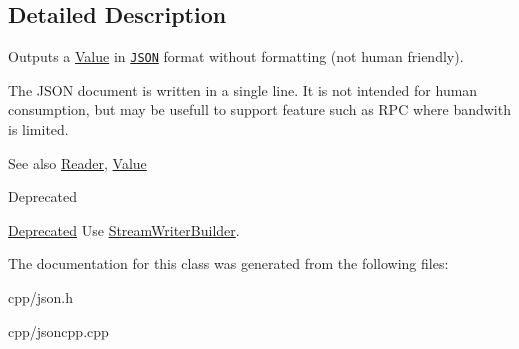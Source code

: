 \subsection{Detailed Description}
Outputs a \hyperlink{class_json_1_1_value}{Value} in \href{http://www.json.org}{\tt J\+S\+ON} format without formatting (not human friendly). 

The J\+S\+ON document is written in a single line. It is not intended for \textquotesingle{}human\textquotesingle{} consumption, but may be usefull to support feature such as R\+PC where bandwith is limited. \begin{DoxySeeAlso}{See also}
\hyperlink{class_json_1_1_reader}{Reader}, \hyperlink{class_json_1_1_value}{Value} 
\end{DoxySeeAlso}
\begin{DoxyRefDesc}{Deprecated}
\item[\hyperlink{deprecated__deprecated000008}{Deprecated}]Use \hyperlink{class_json_1_1_stream_writer_builder}{Stream\+Writer\+Builder}. \end{DoxyRefDesc}


The documentation for this class was generated from the following files\+:\begin{DoxyCompactItemize}
\item 
cpp/json.\+h\item 
cpp/jsoncpp.\+cpp\end{DoxyCompactItemize}
